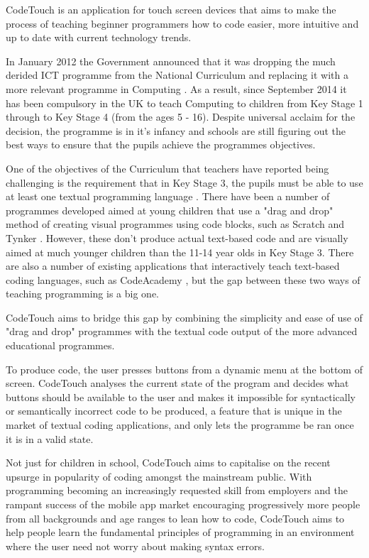 \documentclass[ %
                    author={Jonathan Rankin},
                supervisor={Dr. David May, Dr. Ian Holyer},
                    degree={MEng},
                     title={CodeTouch},
                  subtitle={A Revolutionary Way To Program Real Code On Touch Screen Devices},
                      type={enterprise},
                      year={2015 } ]{dissertation}
\begin{document}
\noindent
CodeTouch is an application for touch screen devices that aims to make the process of teaching beginner programmers 
how to code easier, more intuitive and up to date with current technology trends. 

In January 2012 the Government
announced that it was dropping the much derided ICT programme from the National Curriculum and replacing it with 
a more relevant programme in Computing \cite{BBCITCstory}. As a result, since September 2014 it has been compulsory 
in the UK to teach Computing to children from Key Stage 1 through to Key Stage 4 (from the ages 5 - 16). Despite universal
acclaim for the decision, the programme is in it's infancy and schools are still figuring out the best ways to ensure that the pupils achieve the programmes objectives.

One of the objectives of the Curriculum that teachers have reported being challenging is the requirement that in Key Stage 3, the pupils must be able to use at least one textual programming language \cite{KS3}. There have been a number of programmes developed aimed at young children that use a "drag and drop" method of creating visual programmes using code blocks, such as Scratch \cite{Scratch} and Tynker \cite{Tynker}. However, these don't produce actual text-based code and are visually aimed at much younger children than the 11-14 year olds in Key Stage 3. There are also a number of existing applications that interactively teach text-based coding languages, such as CodeAcademy \cite{CodeAcademy}, but the gap between these two ways of teaching programming is a big one. 

CodeTouch aims to bridge this gap by combining the simplicity and ease of use of "drag and drop" programmes with the textual code output of the more advanced educational programmes. 


To produce code, the user presses buttons from a dynamic menu at the bottom of screen. CodeTouch analyses the current state of the program and decides what buttons should be available to the user and makes it impossible for syntactically or semantically incorrect code to be produced, a feature that is unique in the market of textual coding applications, and only lets the programme be ran once it is in a valid state.

Not just for children in school, CodeTouch aims to capitalise on the recent upsurge in popularity of coding amongst the mainstream public. With programming becoming an increasingly requested skill from employers and the rampant success of the mobile app market encouraging progressively more people from all backgrounds and age ranges to lean how to code, CodeTouch aims to help people learn the fundamental principles of programming in an environment where the user need not worry about making syntax errors. 
\end{document}
